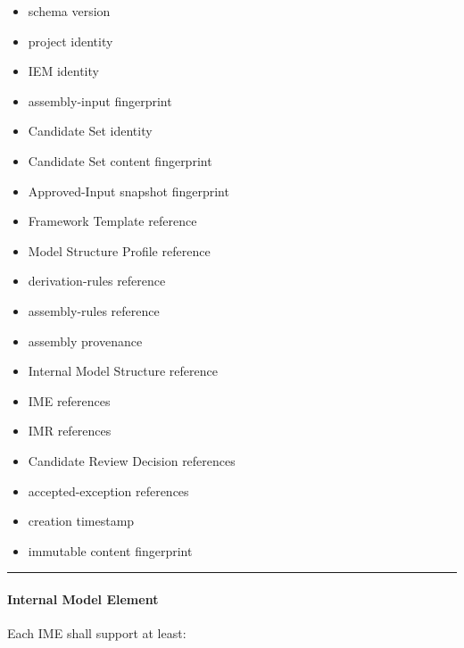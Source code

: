 \begin{itemize}
\tightlist
\item
  schema version
\item
  project identity
\item
  IEM identity
\item
  assembly-input fingerprint
\item
  Candidate Set identity
\item
  Candidate Set content fingerprint
\item
  Approved-Input snapshot fingerprint
\item
  Framework Template reference
\item
  Model Structure Profile reference
\item
  derivation-rules reference
\item
  assembly-rules reference
\item
  assembly provenance
\item
  Internal Model Structure reference
\item
  IME references
\item
  IMR references
\item
  Candidate Review Decision references
\item
  accepted-exception references
\item
  creation timestamp
\item
  immutable content fingerprint
\end{itemize}

\begin{center}\rule{0.5\linewidth}{0.5pt}\end{center}

\hypertarget{internal-model-element}{%
\paragraph{Internal Model Element}\label{internal-model-element}}

Each IME shall support at least:

